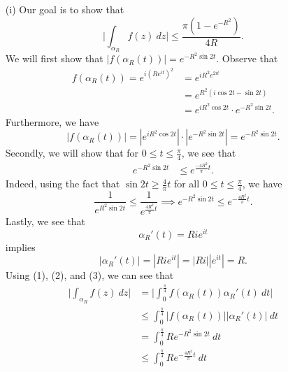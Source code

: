 \documentclass[a4paper]{article}
\begin{document}
\begin{solution}
\begin{enumerate}
    \item[(i)] Our goal is to show that 
           \[  \Big| \int_{ {\alpha}_{R} }^{  } f(z) \ dz   \Big|  \leq \frac{ \pi (1 - e^{- R^{2}}) }{ 4 R }. \]
        We will first show that \( | f(\alpha_R(t)) | = e^{-R^{2} \sin 2 t} \). Observe that 
        \begin{align*}
            f({\alpha}_{R}(t)) = e^{i(R  e^{it })^{2}} &= e^{i R^{2} e^{2it}} \\
                                                       &= e^{R^{2} (i \cos 2 t - \sin 2 t)} \\
                                                       &= e^{i R^{2} \cos 2 t} \cdot e^{- R^{2} \sin 2t}.
        \end{align*}
        Furthermore, we have 
        \[  | f({\alpha}_{R}(t)) | = | e^{i R^{2} \cos 2t } | \cdot | e^{- R^{2} \sin 2t} | = e^{- R^{2} \sin 2t} \tag{1}.  \]
        Secondly, we will show that for \( 0 \leq t \leq \frac{ \pi  }{ 4  }  \), we see that 
        \begin{align*}
            e^{- R^{2} \sin 2t } &\leq  e^{\frac{ -4 R^{2} }{ \pi  } t }.
        \end{align*}
        Indeed, using the fact that \( \sin 2t \geq \frac{ 4  }{ \pi  } t  \) for all \( 0 \leq t \leq \frac{ \pi }{ 4 }  \), we have
        \[  \frac{ 1 }{ e^{R^{2} \sin 2t } }  \leq \frac{ 1  }{ e^{\frac{ 4 R^{2} }{ \pi  } t } } \implies e^{- R^{2} \sin 2t } \leq e^{- \frac{ 4 R^{2} }{ \pi  } t }. \tag{2} \]
        Lastly, we see that 
        \[  {\alpha}_{R}'(t) = R i e^{it }  \] implies
        \[  | {\alpha}_{R}'(t) | = | R i e^{it } | =   | Ri | | e^{it } |  = R. \tag{3} \]
        Using (1), (2), and (3), we can see that
        \begin{align*}
            \Big| \int_{ {\alpha}_{R} }^{  } f(z) \ dz  \Big| &= \Big| \int_{ 0 }^{ \frac{ \pi }{ 4 }  } f({\alpha}_{R}(t)) {\alpha}_{R}'(t) \ dt  \Big|  \\
                                                              &\leq \int_{ 0 }^{ \frac{ \pi }{ 4 }  } | f({\alpha}_{R}(t)) | | {\alpha}_{R}'(t) |  \ dt \\
                                                              &= \int_{ 0 }^{ \frac{ \pi }{ 4 }  } R e^{- R^{2} \sin 2t } \ dt \\
                                                              &\leq \int_{ 0 }^{  \frac{ \pi }{ 4 }  } R e^{-\frac{ 4 R^{2} }{ \pi  } t } \ dt \\

\end{align*}
\end{enumerate}
\end{solution}
\end{document}
